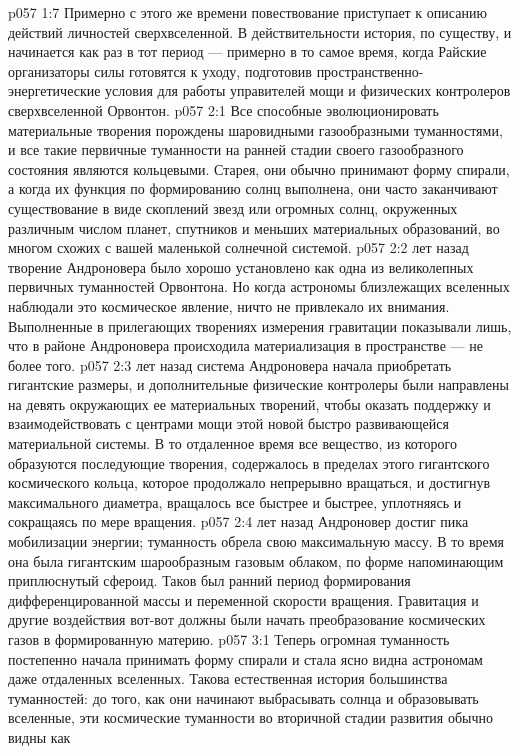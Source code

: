 \vs p057 1:7 Примерно с этого же времени повествование приступает к описанию действий личностей сверхвселенной. В действительности история, по существу, и начинается как раз в тот период --- примерно в то самое время, когда Райские организаторы силы готовятся к уходу, подготовив пространственно\hyp{}энергетические условия для работы управителей мощи и физических контролеров сверхвселенной Орвонтон.
\vs p057 2:1 Все способные эволюционировать материальные творения порождены шаровидными газообразными туманностями, и все такие первичные туманности на ранней стадии своего газообразного состояния являются кольцевыми. Старея, они обычно принимают форму спирали, а когда их функция по формированию солнц выполнена, они часто заканчивают существование в виде скоплений звезд или огромных солнц, окруженных различным числом планет, спутников и меньших материальных образований, во многом схожих с вашей маленькой солнечной системой.
\vs p057 2:2 \pc {} лет назад творение Андроновера было хорошо установлено как одна из великолепных первичных туманностей Орвонтона. Но когда астрономы близлежащих вселенных наблюдали это космическое явление, ничто не привлекало их внимания. Выполненные в прилегающих творениях измерения гравитации показывали лишь, что в районе Андроновера происходила материализация в пространстве --- не более того.
\vs p057 2:3 \pc {} лет назад система Андроновера начала приобретать гигантские размеры, и дополнительные физические контролеры были направлены на девять окружающих ее материальных творений, чтобы оказать поддержку и взаимодействовать с центрами мощи этой новой быстро развивающейся материальной системы. В то отдаленное время все вещество, из которого образуются последующие творения, содержалось в пределах этого гигантского космического кольца, которое продолжало непрерывно вращаться, и достигнув максимального диаметра, вращалось все быстрее и быстрее, уплотняясь и сокращаясь по мере вращения.
\vs p057 2:4 \pc {} лет назад Андроновер достиг пика мобилизации энергии; туманность обрела свою максимальную массу. В то время она была гигантским шарообразным газовым облаком, по форме напоминающим приплюснутый сфероид. Таков был ранний период формирования дифференцированной массы и переменной скорости вращения. Гравитация и другие воздействия вот\hyp{}вот должны были начать преобразование космических газов в формированную материю.
\vs p057 3:1 Теперь огромная туманность постепенно начала принимать форму спирали и стала ясно видна астрономам даже отдаленных вселенных. Такова естественная история большинства туманностей: до того, как они начинают выбрасывать солнца и образовывать вселенные, эти космические туманности во вторичной стадии развития обычно видны как 
